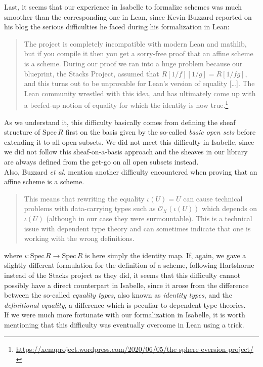 \documentclass[12pt]{scrartcl}
\def\spec{\text{Spec}\,R}
\begin{document}
Last, it seems that our experience in Isabelle to formalize schemes was much smoother than the corresponding one in Lean, since Kevin Buzzard reported on his blog the serious difficulties he faced during his formalization in Lean:
\begin{quote}
	The project is completely incompatible with modern Lean and mathlib, but if you compile it then you get a sorry-free proof that an affine scheme is a scheme. During our proof we ran into a huge problem because our blueprint, the Stacks Project, assumed that $R[1/f][1/g]=R[1/fg]$, and this turns out to be unprovable for Lean’s version of equality [\dots]. The Lean community wrestled with this idea, and has ultimately come up with a beefed-up notion of equality for which the identity is now true.\footnote{\url{https://xenaproject.wordpress.com/2020/06/05/the-sphere-eversion-project/}}
\end{quote}	
As we understand it, this difficulty basically comes from defining the sheaf structure of $\spec$ first on the basis given by the so-called \textit{basic open sets} before extending it to all open subsets. We did not meet this difficulty in Isabelle, since we did not follow this sheaf-on-a-basis approach and the sheaves in our library are always defined from the get-go on all open subsets instead. \\
Also, Buzzard \textit{et al.} mention another difficulty encountered when proving that an affine scheme is a scheme. 
\begin{quote}
	This means that rewriting the equality $\iota(U) = U$ can cause technical problems with data-carrying types such as $\mathscr{O}_X(\iota(U))$ which depends on $\iota(U)$ (although in our case they were surmountable). This is a technical issue with dependent type theory and can sometimes indicate that one is working with the wrong definitions. \cite[3.5]{schemesinLean}
\end{quote}	
where $\iota: \spec \rightarrow \spec$ is here simply the identity map. If, again, we gave a slightly different formulation for the definition of a scheme, following Hartshorne~\cite{hartshorne} instead of the Stacks project \cite{stacksproject} as they did, it seems that this difficulty cannot possibly have a direct counterpart in Isabelle, since it arose from the difference between the so-called \textit{equality types}, also known as \textit{identity types}, and the \textit{definitional equality}, a difference which is peculiar to dependent type theories. \\
If we were much more fortunate with our formalization in Isabelle, it is worth mentioning that this difficulty was eventually overcome in Lean using a trick.  
\end{document}
